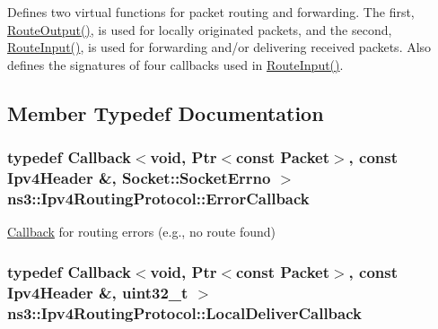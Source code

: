 Defines two virtual functions for packet routing and forwarding. The first, \hyperlink{classns3_1_1Ipv4RoutingProtocol_a9c0e9b77772a4974c06ee4577fe60547}{Route\+Output()}, is used for locally originated packets, and the second, \hyperlink{classns3_1_1Ipv4RoutingProtocol_a67e815ff40ebb9f5f4eec4e22e23132e}{Route\+Input()}, is used for forwarding and/or delivering received packets. Also defines the signatures of four callbacks used in \hyperlink{classns3_1_1Ipv4RoutingProtocol_a67e815ff40ebb9f5f4eec4e22e23132e}{Route\+Input()}. 

\subsection{Member Typedef Documentation}
\subsubsection[{\texorpdfstring{Error\+Callback}{ErrorCallback}}]{\setlength{\rightskip}{0pt plus 5cm}typedef {\bf Callback}$<$void, {\bf Ptr}$<$const {\bf Packet}$>$, const {\bf Ipv4\+Header} \&, {\bf Socket\+::\+Socket\+Errno} $>$ {\bf ns3\+::\+Ipv4\+Routing\+Protocol\+::\+Error\+Callback}}\hypertarget{classns3_1_1Ipv4RoutingProtocol_a0348285418c30d5021b08f7a68af21ea}{}\label{classns3_1_1Ipv4RoutingProtocol_a0348285418c30d5021b08f7a68af21ea}


\hyperlink{classns3_1_1Callback}{Callback} for routing errors (e.\+g., no route found) 

\subsubsection[{\texorpdfstring{Local\+Deliver\+Callback}{LocalDeliverCallback}}]{\setlength{\rightskip}{0pt plus 5cm}typedef {\bf Callback}$<$void, {\bf Ptr}$<$const {\bf Packet}$>$, const {\bf Ipv4\+Header} \&, uint32\+\_\+t $>$ {\bf ns3\+::\+Ipv4\+Routing\+Protocol\+::\+Local\+Deliver\+Callback}}\hypertarget{classns3_1_1Ipv4RoutingProtocol_aa6ffa0159cb143daa3c46d2ba69bb1b9}{}\label{classns3_1_1Ipv4RoutingProtocol_aa6ffa0159cb143daa3c46d2ba69bb1b9}



